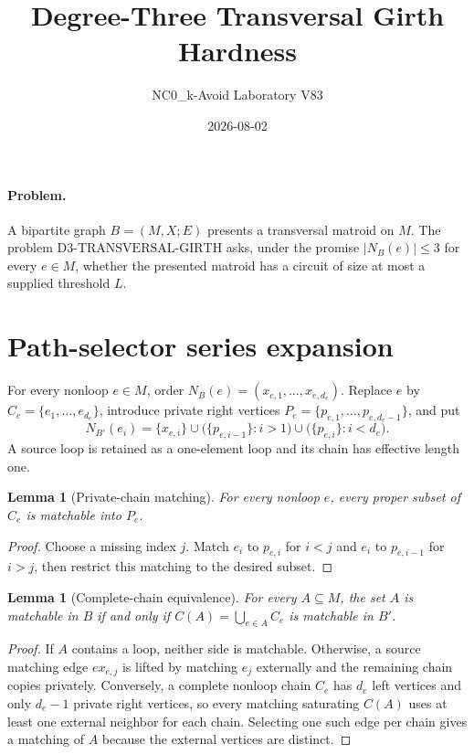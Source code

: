 \documentclass[11pt]{article}
\title{Degree-Three Transversal Girth Hardness}
\author{NC0\_k-Avoid Laboratory V83}
\date{2026-08-02}
\newtheorem{lemma}[theorem]{Lemma}
\begin{document}
\maketitle

\paragraph{Problem.}
A bipartite graph $B=(M,X;E)$ presents a transversal matroid on $M$.
The problem $\mathrm{D3\text{-}TRANSVERSAL\text{-}GIRTH}$ asks, under the
promise $|N_B(e)|\leq 3$ for every $e\in M$, whether the presented matroid has
a circuit of size at most a supplied threshold $L$.

\section{Path-selector series expansion}
For every nonloop $e\in M$, order
$N_B(e)=(x_{e,1},\ldots,x_{e,d_e})$. Replace $e$ by
$C_e=\{e_1,\ldots,e_{d_e}\}$, introduce private right vertices
$P_e=\{p_{e,1},\ldots,p_{e,d_e-1}\}$, and put
\[
 N_{B'}(e_i)=\{x_{e,i}\}\cup
 \bigl(\{p_{e,i-1}\}:i>1\bigr)\cup
 \bigl(\{p_{e,i}\}:i<d_e\bigr).
\]
A source loop is retained as a one-element loop and its chain has effective
length one.

\begin{lemma}[Private-chain matching]
For every nonloop $e$, every proper subset of $C_e$ is matchable into $P_e$.
\end{lemma}
\begin{proof}
Choose a missing index $j$. Match $e_i$ to $p_{e,i}$ for $i<j$ and $e_i$ to
$p_{e,i-1}$ for $i>j$, then restrict this matching to the desired subset.
\end{proof}

\begin{lemma}[Complete-chain equivalence]
For every $A\subseteq M$, the set $A$ is matchable in $B$ if and only if
$C(A)=\bigcup_{e\in A}C_e$ is matchable in $B'$.
\end{lemma}
\begin{proof}
If $A$ contains a loop, neither side is matchable. Otherwise, a source matching
edge $e x_{e,j}$ is lifted by matching $e_j$ externally and the remaining chain
copies privately. Conversely, a complete nonloop chain $C_e$ has $d_e$ left
vertices and only $d_e-1$ private right vertices, so every matching saturating
$C(A)$ uses at least one external neighbor for each chain. Selecting one such
edge per chain gives a matching of $A$ because the external vertices are
distinct.
\end{proof}
\end{document}
